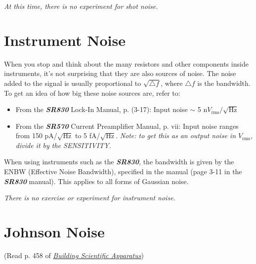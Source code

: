 \documentclass{../lab}
\begin{document}
\emph{At this time, there is no experiment for shot noise.}

\section{Instrument Noise}

When you stop and think about the many resistors and other components inside instruments, it's not surprising that they are also sources of noise. The noise added to the signal is usually proportional to $\sqrt{\triangle f}$, where $\triangle f$ is the bandwidth. To get an idea of how big these noise sources are, refer to:

\begin{itemize}
    \item From the 
    \emph{\textbf{SR830}} Lock-In Manual, p. (3-17): Input noise $\sim$ 5 n$V_\text{rms}/\sqrt{\text{Hz}}$

    \item From the 
    \emph{\textbf{SR570}} Current Preamplifier Manual, p. vii: Input noise ranges from 150 pA/$\sqrt{\text{Hz}}$ to 5 fA/$\sqrt{\text{Hz}}$. \emph{Note: to get this as an output noise in $V_\text{rms}$, divide it by the SENSITIVITY.}
\end{itemize}


When using instruments such as the \emph{\textbf{SR830}}, the bandwidth is given by the ENBW (Effective Noise Bandwidth), specified in the manual (page 3-11 in the \emph{\textbf{SR830}} manual). This applies to all forms of Gaussian noise.


\noindent\emph{There is no exercise or experiment for instrument noise.}

\section{Johnson Noise}

(Read p. 458 of \href{https://drive.google.com/file/d/1RMHJY_8PrdhAJmcfJQySjcX1nUFYyLKk/view?usp=drive_link}{\emph{Building Scientific Apparatus}})
\end{document}
